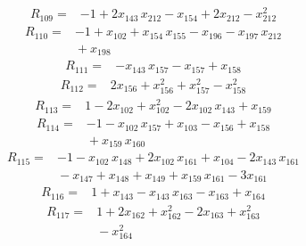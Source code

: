 \documentclass[11pt]{article}
\begin{document}
\begin{equation*}\begin{aligned}
R_{109}={}&-1 + 2x_{143}\,x_{212} - x_{154} + 2x_{212} - x_{212}^{2}
\end{aligned}\end{equation*}
\begin{equation*}\begin{aligned}
R_{110}={}&-1 + x_{102} + x_{154}\,x_{155} - x_{196} - x_{197}\,x_{212} \\
&{} + x_{198}
\end{aligned}\end{equation*}
\begin{equation*}\begin{aligned}
R_{111}={}&-x_{143}\,x_{157} - x_{157} + x_{158}
\end{aligned}\end{equation*}
\begin{equation*}\begin{aligned}
R_{112}={}&2x_{156} + x_{156}^{2} + x_{157}^{2} - x_{158}^{2}
\end{aligned}\end{equation*}
\begin{equation*}\begin{aligned}
R_{113}={}&1 - 2x_{102} + x_{102}^{2} - 2x_{102}\,x_{143} + x_{159}
\end{aligned}\end{equation*}
\begin{equation*}\begin{aligned}
R_{114}={}&-1 - x_{102}\,x_{157} + x_{103} - x_{156} + x_{158} \\
&{} + x_{159}\,x_{160}
\end{aligned}\end{equation*}
\begin{equation*}\begin{aligned}
R_{115}={}&-1 - x_{102}\,x_{148} + 2x_{102}\,x_{161} + x_{104} - 2x_{143}\,x_{161} \\
&{} - x_{147} + x_{148} + x_{149} + x_{159}\,x_{161} - 3x_{161}
\end{aligned}\end{equation*}
\begin{equation*}\begin{aligned}
R_{116}={}&1 + x_{143} - x_{143}\,x_{163} - x_{163} + x_{164}
\end{aligned}\end{equation*}
\begin{equation*}\begin{aligned}
R_{117}={}&1 + 2x_{162} + x_{162}^{2} - 2x_{163} + x_{163}^{2} \\
&{} - x_{164}^{2}
\end{aligned}\end{equation*}
\end{document}
